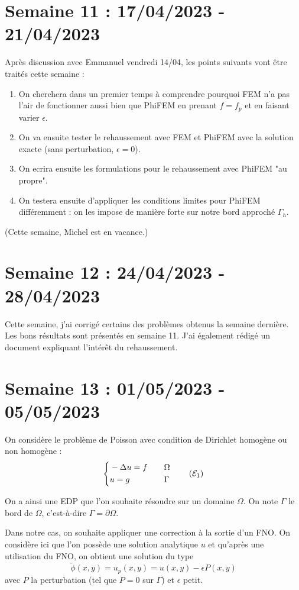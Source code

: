 \documentclass[french]{article}
\begin{document}
\section{Semaine 11 : 17/04/2023 - 21/04/2023}
	Après discussion avec Emmanuel vendredi 14/04, les points suivants vont être traités cette semaine :
	\begin{enumerate}[label=\textbullet]
		\item On cherchera dans un premier temps à comprendre pourquoi FEM n'a pas l'air de fonctionner aussi bien que PhiFEM en prenant $f=f_p$ et en faisant varier $\epsilon$.
		\item On va ensuite tester le rehaussement avec FEM et PhiFEM avec la solution exacte (sans perturbation, $\epsilon=0$).
		\item On ecrira ensuite les formulations pour le rehaussement avec PhiFEM "au propre".
		\item On testera ensuite d'appliquer les conditions limites pour PhiFEM différemment : on les impose de manière forte sur notre bord approché $\Gamma_h$.
	\end{enumerate}
	(Cette semaine, Michel est en vacance.)
\section{Semaine 12 : 24/04/2023 - 28/04/2023}
	Cette semaine, j'ai corrigé certains des problèmes obtenus la semaine dernière. Les bons résultats sont présentés en semaine 11. J'ai également rédigé un document expliquant l'intérêt du rehaussement.
\section{Semaine 13 : 01/05/2023 - 05/05/2023}
	On considère le problème de Poisson avec condition de Dirichlet homogène ou non homogène :
	\begin{equation}
		\label{pb1}
		\left\{\begin{aligned}
			&-\Delta u=f \quad &&\Omega \\
			&u=g \quad &&\Gamma
		\end{aligned}\right. \tag{$\mathcal{E}_1$}
	\end{equation}
	
	On a ainsi une EDP que l'on souhaite résoudre sur un domaine $\Omega$. On note $\Gamma$ le bord de $\Omega$, c'est-à-dire $\Gamma=\partial\Omega$. 
	
	Dans notre cas, on souhaite appliquer une correction à la sortie d'un FNO.
	On considère ici que l'on possède une solution analytique $u$ et qu'après une utilisation du FNO, on obtient une solution du type
	\begin{equation*}
		\label{phi_tild}
		\tilde{\phi}(x,y)=u_p(x,y) = u(x,y)-\epsilon P(x,y)
	\end{equation*}
	avec $P$ la perturbation (tel que $P=0$ sur $\Gamma$) et $\epsilon$ petit.
	
\end{document}
